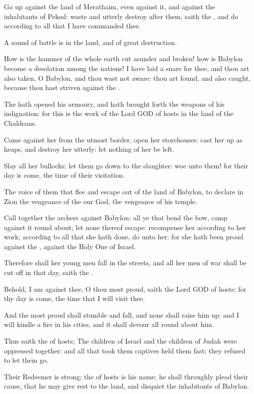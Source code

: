 \verse Go up against the land of Merathaim, even against it, and against the inhabitants of Pekod: waste and utterly destroy after them, saith the \LORD, and do according to all that I have commanded thee.

\verse A sound of battle is in the land, and of great destruction.

\verse How is the hammer of the whole earth cut asunder and broken! how is Babylon become a desolation among the nations!  \verse I have laid a snare for thee, and thou art also taken, O Babylon, and thou wast not aware: thou art found, and also caught, because thou hast striven against the \LORD.

\verse The \LORD hath opened his armoury, and hath brought forth the weapons of his indignation: for this is the work of the Lord GOD of hosts in the land of the Chaldeans.

\verse Come against her from the utmost border, open her storehouses: cast her up as heaps, and destroy her utterly: let nothing of her be left.

\verse Slay all her bullocks; let them go down to the slaughter: woe unto them! for their day is come, the time of their visitation.

\verse The voice of them that flee and escape out of the land of Babylon, to declare in Zion the vengeance of the \LORD our God, the vengeance of his temple.

\verse Call together the archers against Babylon: all ye that bend the bow, camp against it round about; let none thereof escape: recompense her according to her work; according to all that she hath done, do unto her: for she hath been proud against the \LORD, against the Holy One of Israel.

\verse Therefore shall her young men fall in the streets, and all her men of war shall be cut off in that day, saith the \LORD.

\verse Behold, I am against thee, O thou most proud, saith the Lord GOD of hosts: for thy day is come, the time that I will visit thee.

\verse And the most proud shall stumble and fall, and none shall raise him up: and I will kindle a fire in his cities, and it shall devour all round about him.

\verse Thus saith the \LORD of hosts; The children of Israel and the children of Judah were oppressed together: and all that took them captives held them fast; they refused to let them go.

\verse Their Redeemer is strong; the \LORD of hosts is his name: he shall throughly plead their cause, that he may give rest to the land, and disquiet the inhabitants of Babylon.

